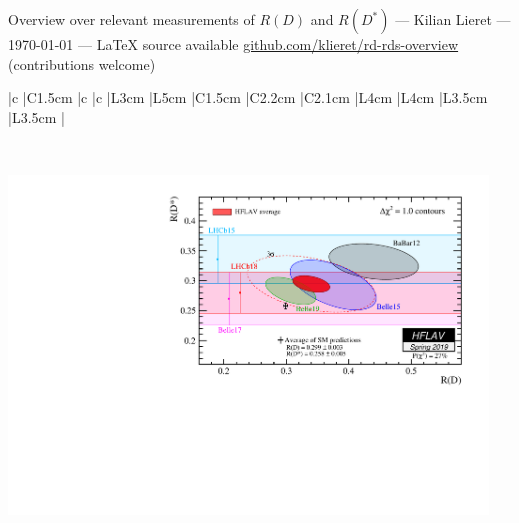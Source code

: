 \documentclass[10pt, landscape]{article}
\begin{document}
    \begin{center}\Large
        Overview over relevant measurements of $R(D)$ and $R(D^*)$
        --- Kilian Lieret
        --- \today 
        --- \LaTeX{} source available \url{github.com/klieret/rd-rds-overview} (contributions welcome)
    \end{center}
    
    \begin{center}
        \begin{tabular}{
                |c %
                |C{1.5cm} %
                |c %
                |c %
                |L{3cm} %
                |L{5cm} %
                |C{1.5cm} %
                |C{2.2cm} %
                |C{2.1cm} %
                |L{4cm} %
                |L{4cm} %
                |L{3.5cm} %
                |L{3.5cm} %
                |
                }
            \hline\hline
            
            \\\hline\hline
        \end{tabular}
    \end{center}
    
    \vspace{1cm}
    \includegraphics[height=9cm]{fig/hflav.pdf}
    
\end{document}
